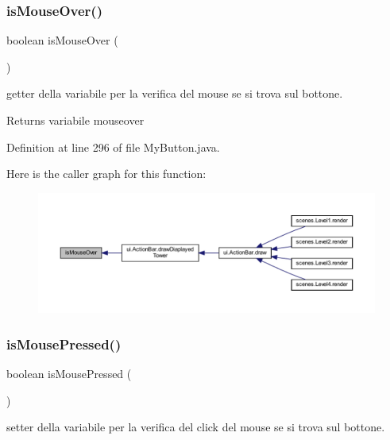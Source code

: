 \subsubsection{\texorpdfstring{is\+Mouse\+Over()}{isMouseOver()}}
{\footnotesize\ttfamily boolean is\+Mouse\+Over (\begin{DoxyParamCaption}{ }\end{DoxyParamCaption})}



getter della variabile per la verifica del mouse se si trova sul bottone. 

\begin{DoxyReturn}{Returns}
variabile mouseover 
\end{DoxyReturn}


Definition at line 296 of file My\+Button.\+java.

Here is the caller graph for this function\+:\nopagebreak
\begin{figure}[H]
\begin{center}
\leavevmode
\includegraphics[width=350pt]{classui_1_1_my_button_a2deebd864f1c01a6d81238349c929885_icgraph}
\end{center}
\end{figure}
\mbox{\label{classui_1_1_my_button_ad47389f2ab3067af3626db75a6b3b09e}} 
\subsubsection{\texorpdfstring{is\+Mouse\+Pressed()}{isMousePressed()}}
{\footnotesize\ttfamily boolean is\+Mouse\+Pressed (\begin{DoxyParamCaption}{ }\end{DoxyParamCaption})}



setter della variabile per la verifica del click del mouse se si trova sul bottone. 

